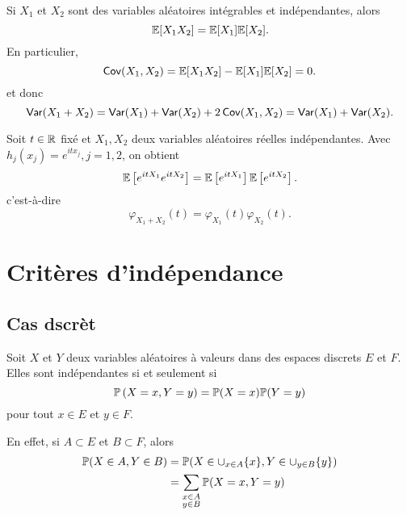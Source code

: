 \begin{example}
    Si \(X_1\) et \(X_2\) sont  des variables aléatoires intégrables et indépendantes, alors
    \begin{equation*}
        \mathbb{E}[X_1X_2] = \mathbb{E}[X_1]\mathbb{E}[X_2].
    \end{equation*}
    En particulier,
    \begin{equation*}
        \operatorname{\mathsf{Cov}}(X_1,X_2) = \mathbb{E}[X_1X_2] - \mathbb{E}[X_1]\mathbb{E}[X_2] = 0.
    \end{equation*}
    et donc
    \begin{equation*}
        \operatorname{\mathsf{Var}}(X_1+X_2) = \operatorname{\mathsf{Var}}(X_1) + \operatorname{\mathsf{Var}}(X_2) + 2\operatorname{\mathsf{Cov}}(X_1,X_2) = \operatorname{\mathsf{Var}}(X_1) + \operatorname{\mathsf{Var}}(X_2).
    \end{equation*}
\end{example}

\begin{example}
    Soit \(t\in\mathbb{R}\) fixé et \(X_1, X_2\) deux variables aléatoires réelles indépendantes.
    Avec \(h_j(x_j) = e^{itx_j}, j=1,2\), on obtient
    \begin{equation*}
        \mathbb{E}\left[ e^{itX_1}e^{itX_2} \right] = \mathbb{E}\left[ e^{itX_1} \right]\mathbb{E}\left[ e^{itX_2} \right].
    \end{equation*}
    c'est-à-dire
    \begin{equation*}
        \varphi_{X_1+X_2}(t) = \varphi_{X_1}(t)\varphi_{X_2}(t).
    \end{equation*}
\end{example}

\section{Critères d'indépendance} %

\subsection*{Cas dscrèt}\label{subsection:discret}
\setcounter{subsection}{1}

Soit \(X\) et \(Y\) deux variables aléatoires à valeurs dans des espaces 
discrets \(E\) et \(F\). Elles sont indépendantes si et seulement si
\begin{equation*}
    \mathbb{P} \left( X = x, Y = y \right) = \mathbb{P}(X = x)\mathbb{P}(Y = y)
\end{equation*}
pour tout \(x\in E\) et \(y\in F\).

En effet, si \(A\subset E\) et \(B\subset F\), alors
\begin{equation*}
    \begin{aligned}
        \mathbb{P}(X\in A, Y\in B) 
        &= \mathbb{P}(X \in \cup_{x\in A} \{x\}, Y\in \cup_{y\in B} \{y\})\\
        &= \sum_{\substack{x\in A\\y\in B}} \mathbb{P}(X = x, Y = y)\\
    \end{aligned}
\end{equation*}

